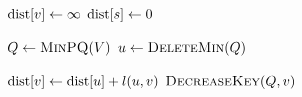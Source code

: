 
\begin{algorithm}[H]
  \begin{algorithmic}
      \State $\text{dist}[v] \gets \infty$
    \EndFor
    \State $\text{dist}[s] \gets 0$

    \Statex
    \State $Q \gets \textsc{MinPQ}(V)$
      \State $u \gets \textsc{DeleteMin}(Q)$

      \hStatex
	  \State $\text{dist}[v] \gets \text{dist}[u] + l(u,v)$
	  \State $\textsc{DecreaseKey}(Q, v)$
	\EndIf
      \EndFor
    \EndWhile
  \end{algorithmic}
\end{algorithm}
